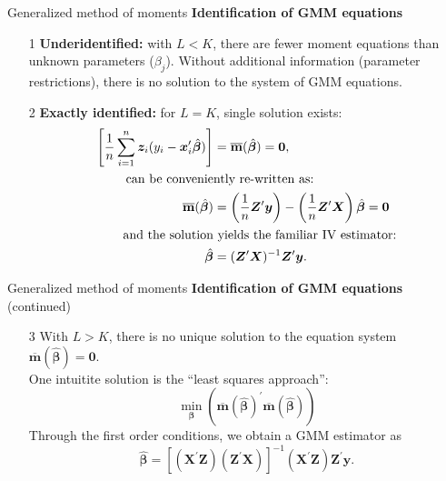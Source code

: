 \documentclass{beamer}
\begin{document}
\begin{frame}{Generalized method of moments}
\textbf{Identification of GMM equations}
\bigskip
\begin{itemize}
    \item[1] \textbf{Underidentified:} with $L < K$, there are fewer moment equations than unknown parameters ($\beta_j$). Without additional information (parameter restrictions), there is no solution to the system of GMM equations.
    \bigskip
    \item[2] \textbf{Exactly identified:} for $L = K$, single solution exists:  
    \begin{equation*}
        \begin{aligned}
        \left[ \frac{1}{n} \sum_{i=1}^n \bm{z}_i (y_i - \bm{x}_i^{\prime}\hat{\bm{\beta}}) \right]
&= \overline{\mathbf{m}}(\hat{\bm{\beta}}) = \bm{0},\\
\textnormal{can be convenie} & \textnormal{ntly~re-written as:}\\
\overline{\mathbf{m}}(\hat{\bm{\beta}}) &= \left( \frac{1}{n} \bm{Z}^{\prime} \bm{y} \right) - \left( \frac{1}{n} \bm{Z}^{\prime} \bm{X} \right) \hat{\bm{\beta}} = \bm{0}\\
\textnormal{and the solution} & \textnormal{~yields the familiar IV estimator:}\\
\hat{\bm{\beta}} &=     (\bm{Z}^{\prime}\bm{X})^{-1} \bm{Z}^{\prime}\bm{y}.
        \end{aligned}
    \end{equation*}
\end{itemize}
\end{frame}
\begin{frame}{Generalized method of moments}
\textbf{Identification of GMM equations} (continued)
\bigskip
\begin{itemize}
    \item[3] With $L > K$, there is no unique solution to the equation system $\overline{\mathbf{m}}(\hat{\bm{\beta}}) = \bm{0}$. \\
    \medskip
    One intuitite solution is the ``least squares approach'':
    $$\underset{\bm{\beta}}{\min}\left(  \overline{\mathbf{m}}(\hat{\bm{\beta}})^{\prime} \overline{\mathbf{m}}(\hat{\bm{\beta}})  \right)$$
    Through the first order conditions, we obtain a GMM estimator as
    $$
    \hat{\bm{\beta}} =\left[ (\bm{X}^{\prime}\bm{Z}) (\bm{Z}^{\prime}\bm{X}) \right]^{-1} (\bm{X}^{\prime}\bm{Z}) \bm{Z}^{\prime}\bm{y}.
    $$
\end{itemize}
\end{frame}
\end{document}

